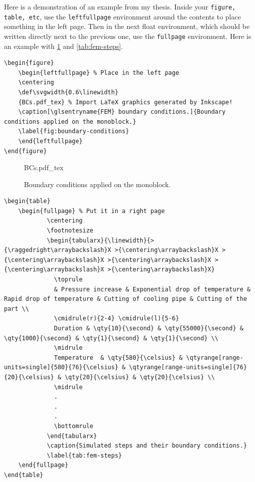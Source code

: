 Here is a demonstration of an example from my thesis. Inside your \texttt{figure, table, etc}, use the \verb|leftfullpage| environment around the contents to place something in the left page. Then in the next float environment, which should be written directly next to the previous one, use the \verb|fullpage| environment. Here is an example with \cref{fig:boundary-conditions} and \cref{tab:fem-steps}.

\begin{lstlisting}[language={[LaTeX]TeX}]
\begin{figure}
	\begin{leftfullpage} % Place in the left page
	\centering
	\def\svgwidth{0.6\linewidth}
	{BCs.pdf_tex} % Import LaTeX graphics generated by Inkscape!
	\caption[\glsentryname{FEM} boundary conditions.]{Boundary conditions applied on the monoblock.}
	\label{fig:boundary-conditions}
	\end{leftfullpage}
\end{figure}
\end{lstlisting}

\begin{figure}
	\begin{leftfullpage} %
	\centering
	\def\svgwidth{0.6\linewidth}
	{BCs.pdf_tex} %
	\caption[ boundary conditions.]{Boundary conditions applied on the monoblock.}
	\label{fig:boundary-conditions}
	\end{leftfullpage}
\end{figure}

\begin{lstlisting}[language={[LaTeX]TeX}]
\begin{table}
	\begin{fullpage} % Put it in a right page
			\centering
			\footnotesize
			\begin{tabularx}{\linewidth}{>{\raggedright\arraybackslash}X >{\centering\arraybackslash}X >{\centering\arraybackslash}X >{\centering\arraybackslash}X >{\centering\arraybackslash}X >{\centering\arraybackslash}X}
			  \toprule
			  & Pressure increase & Exponential drop of temperature & Rapid drop of temperature & Cutting of cooling pipe & Cutting of the part \\
			  \cmidrule(r){2-4} \cmidrule(l){5-6}
			  Duration & \qty{10}{\second} & \qty{55000}{\second} & \qty{1000}{\second} & \qty{1}{\second} & \qty{1}{\second} \\
			  \midrule
			  Temperature  & \qty{580}{\celsius} & \qtyrange[range-units=single]{580}{76}{\celsius} & \qtyrange[range-units=single]{76}{20}{\celsius} & \qty{20}{\celsius} & \qty{20}{\celsius} \\
			  \midrule
			  .
			  .
			  .
			  \bottomrule
			\end{tabularx}
			\caption{Simulated steps and their boundary conditions.}
			\label{tab:fem-steps}
	\end{fullpage}
\end{table}
\end{lstlisting}

